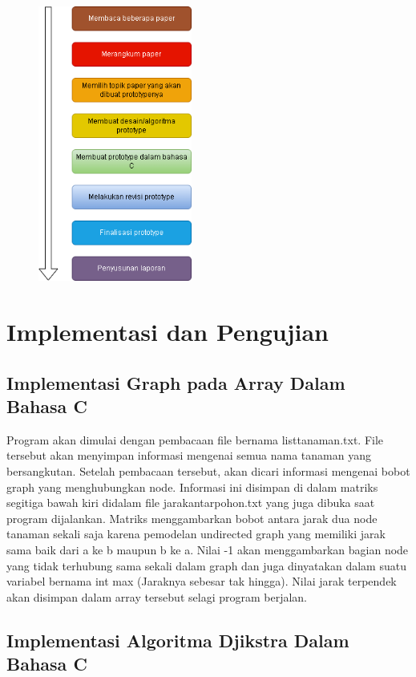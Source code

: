 \documentclass[10pt]{IEEEtran}
\begin{document}
\begin{figure}[htbp]
	\centering
	\includegraphics[width=0.45\textwidth]{djikstralaporanmaking.png}
\end{figure}

\section{Implementasi dan Pengujian}
\subsection{Implementasi Graph pada Array Dalam Bahasa C }
Program akan dimulai dengan pembacaan file bernama
listtanaman.txt. File tersebut akan menyimpan informasi mengenai semua nama tanaman yang bersangkutan. Setelah pembacaan tersebut, akan dicari informasi mengenai bobot graph
yang menghubungkan node. Informasi ini disimpan di dalam
matriks segitiga bawah kiri didalam file jarakantarpohon.txt
yang juga dibuka saat program dijalankan. Matriks menggambarkan 
bobot antara jarak dua node tanaman sekali saja karena
pemodelan undirected graph yang memiliki jarak sama baik
dari a ke b maupun b ke a. Nilai -1 akan menggambarkan
bagian node yang tidak terhubung sama sekali dalam graph
dan juga dinyatakan dalam suatu variabel bernama int max
(Jaraknya sebesar tak hingga). Nilai jarak terpendek akan
disimpan dalam array tersebut selagi program berjalan.

\subsection{Implementasi Algoritma Djikstra Dalam Bahasa C}
\end{document}

